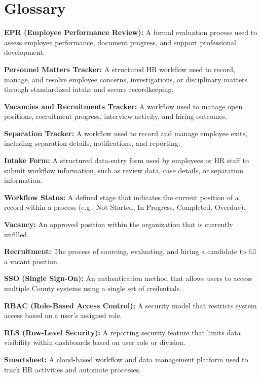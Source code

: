 \documentclass[12pt]{article}
\begin{document}
\appendix

\section{Glossary}

\textbf{EPR (Employee Performance Review):} A formal evaluation process used to assess employee performance, document progress, and support professional development.

\textbf{Personnel Matters Tracker:} A structured HR workflow used to record, manage, and resolve employee concerns, investigations, or disciplinary matters through standardized intake and secure recordkeeping.

\textbf{Vacancies and Recruitments Tracker:} A workflow used to manage open positions, recruitment progress, interview activity, and hiring outcomes.

\textbf{Separation Tracker:} A workflow used to record and manage employee exits, including separation details, notifications, and reporting.

\textbf{Intake Form:} A structured data-entry form used by employees or HR staff to submit workflow information, such as review data, case details, or separation information.

\textbf{Workflow Status:} A defined stage that indicates the current position of a record within a process (e.g., Not Started, In Progress, Completed, Overdue).

\textbf{Vacancy:} An approved position within the organization that is currently unfilled.

\textbf{Recruitment:} The process of sourcing, evaluating, and hiring a candidate to fill a vacant position.

\textbf{SSO (Single Sign-On):} An authentication method that allows users to access multiple County systems using a single set of credentials.

\textbf{RBAC (Role-Based Access Control):} A security model that restricts system access based on a user’s assigned role.

\textbf{RLS (Row-Level Security):} A reporting security feature that limits data visibility within dashboards based on user role or division.

\textbf{Smartsheet:} A cloud-based workflow and data management platform used to track HR activities and automate processes.
\end{document}
